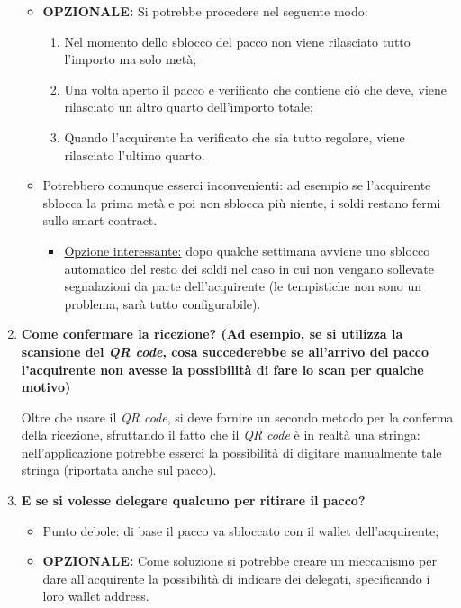 \documentclass[11pt]{article}
\begin{document}
\begin{enumerate}
				\begin{itemize}
					\item \textbf{OPZIONALE:} Si potrebbe procedere nel seguente modo:
					\begin{enumerate}
						\item Nel momento dello sblocco del pacco non viene rilasciato tutto l'importo ma solo metà;
						\item Una volta aperto il pacco e verificato che contiene ciò che deve, viene rilasciato un altro
						quarto dell'importo totale;
						\item Quando l'acquirente ha verificato che sia tutto regolare, viene rilasciato l'ultimo quarto.
					\end{enumerate}
					\item Potrebbero comunque esserci inconvenienti: ad esempio se l'acquirente sblocca la prima metà e poi non sblocca
					più niente, i soldi restano fermi sullo smart-contract.
					\begin{itemize}
						\item \underline{Opzione interessante:} dopo qualche settimana avviene uno sblocco automatico del resto dei soldi
						nel caso in cui non vengano sollevate segnalazioni da parte dell'acquirente (le tempistiche non sono un
						problema, sarà tutto configurabile).
					\end{itemize}
				\end{itemize}
				
				\bigskip
				
				\item \textbf{Come confermare la ricezione? (Ad esempio, se si utilizza la scansione del \textit{QR code}, cosa
				succederebbe se all'arrivo del pacco l'acquirente non avesse la possibilità di fare lo scan per qualche motivo)}
				
				\medskip
				
				Oltre che usare il \textit{QR code}, si deve fornire un secondo metodo per la conferma della ricezione, sfruttando il fatto
				che il \textit{QR code} è in realtà una stringa: nell'applicazione potrebbe esserci la possibilità di digitare manualmente
				tale stringa (riportata anche sul pacco).
				
				\bigskip
				
				\item \textbf{E se si volesse delegare qualcuno per ritirare il pacco?}
				
				\medskip
				
				\begin{itemize}
					\item Punto debole: di base il pacco va sbloccato con il wallet dell'acquirente;
					\item \textbf{OPZIONALE:} Come soluzione si potrebbe creare un meccanismo per dare all'acquirente la possibilità di indicare
					dei delegati, specificando i loro wallet address.
				\end{itemize}


\end{enumerate}
\end{document}
